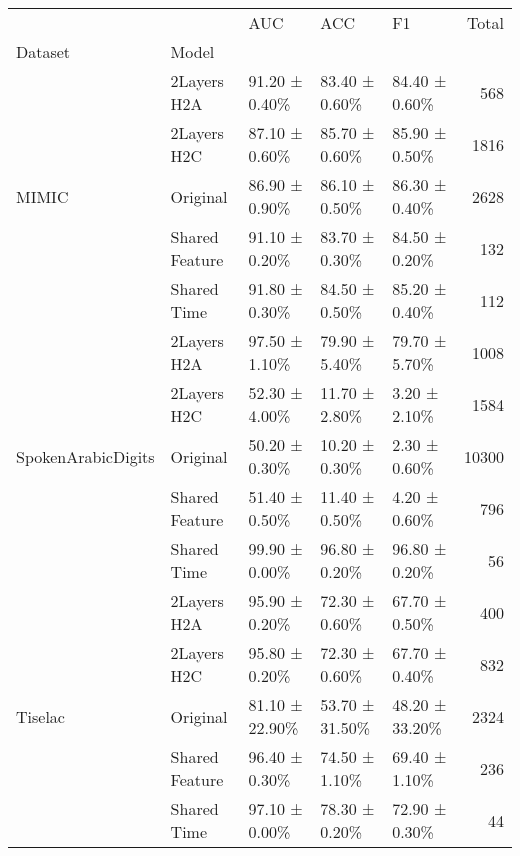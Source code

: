 \begin{tabular}{lllllr}
\toprule
 &  & AUC & ACC & F1 & Total \\
Dataset & Model &  &  &  &  \\
\midrule
\multirow[t]{5}{*}{MIMIC} & 2Layers H2A & 91.20 ± 0.40\% & 83.40 ± 0.60\% & 84.40 ± 0.60\% & 568 \\
 & 2Layers H2C & 87.10 ± 0.60\% & 85.70 ± 0.60\% & 85.90 ± 0.50\% & 1816 \\
 & Original & 86.90 ± 0.90\% & 86.10 ± 0.50\% & 86.30 ± 0.40\% & 2628 \\
 & Shared Feature & 91.10 ± 0.20\% & 83.70 ± 0.30\% & 84.50 ± 0.20\% & 132 \\
 & Shared Time & 91.80 ± 0.30\% & 84.50 ± 0.50\% & 85.20 ± 0.40\% & 112 \\
\cline{1-6}
\multirow[t]{5}{*}{SpokenArabicDigits} & 2Layers H2A & 97.50 ± 1.10\% & 79.90 ± 5.40\% & 79.70 ± 5.70\% & 1008 \\
 & 2Layers H2C & 52.30 ± 4.00\% & 11.70 ± 2.80\% & 3.20 ± 2.10\% & 1584 \\
 & Original & 50.20 ± 0.30\% & 10.20 ± 0.30\% & 2.30 ± 0.60\% & 10300 \\
 & Shared Feature & 51.40 ± 0.50\% & 11.40 ± 0.50\% & 4.20 ± 0.60\% & 796 \\
 & Shared Time & 99.90 ± 0.00\% & 96.80 ± 0.20\% & 96.80 ± 0.20\% & 56 \\
\cline{1-6}
\multirow[t]{5}{*}{Tiselac} & 2Layers H2A & 95.90 ± 0.20\% & 72.30 ± 0.60\% & 67.70 ± 0.50\% & 400 \\
 & 2Layers H2C & 95.80 ± 0.20\% & 72.30 ± 0.60\% & 67.70 ± 0.40\% & 832 \\
 & Original & 81.10 ± 22.90\% & 53.70 ± 31.50\% & 48.20 ± 33.20\% & 2324 \\
 & Shared Feature & 96.40 ± 0.30\% & 74.50 ± 1.10\% & 69.40 ± 1.10\% & 236 \\
 & Shared Time & 97.10 ± 0.00\% & 78.30 ± 0.20\% & 72.90 ± 0.30\% & 44 \\
\cline{1-6}
\bottomrule
\end{tabular}
